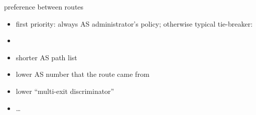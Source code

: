 \begin{frame}{preference between routes}
    \begin{itemize}
    \item first priority: always AS administrator's policy; otherwise
    typical tie-breaker:
    \vspace{.5cm}
    \item {}
    \item shorter AS path list
    \item lower AS number that the route came from
    \item lower ``multi-exit discriminator''
    \item  \ldots
    \end{itemize}
\end{frame}
